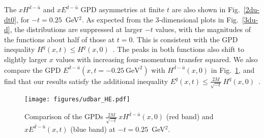 \documentclass[preprintnumbers,prd,superscriptaddress,preprint]{revtex4-1}
\begin{document}


The $xH^{\bar{d}-\bar{u}}$ and $xE^{\bar{d}-\bar{u}}$ GPD asymmetries at finite $t$ are also shown in Fig.~\ref{2du-dt0}, for $-t = 0.25$~GeV$^2$.
As expected from the 3-dimensional plots in Fig.~\ref{3du-d}, the distributions are suppressed at larger $-t$ values, with the magnitudes of the functions about half of those at $t=0$.
This is consistent with the GPD inequality $H^q(x,t) \leq H^q(x,0)$~\cite{Pobylitsa:2002gw, Radyushkin:1998es}.
The peaks in both functions also shift to slightly larger $x$ values with increasing four-momentum transfer squared.  
We also compare the GPD $E^{\bar{d}-\bar{u}}(x,t=-0.25~\text{GeV}^2)$ with $H^{\bar{d}-\bar{u}}(x,0)$ in Fig.~\ref{fig:ineq_ud}, and find that our results satisfy the additional inequality $E^q(x,t) \leq \frac{2M}{\sqrt{-t}}\, H^q(x,0)$~\cite{Pobylitsa:2002gw}.


\begin{figure}[tp]
\begin{center}
\texttt{[image: figures/udbar\_HE.pdf]}
\caption{Comparison of the GPDs $\frac{2M}{\sqrt{-t}}\, xH^{\bar d-\bar u}(x,0)$ (red band) and $xE^{\bar d-\bar u}(x,t)$ (blue band) at $-t = 0.25$~GeV$^2$.} 
\label{fig:ineq_ud}
\end{center}
\end{figure}
\end{document}
